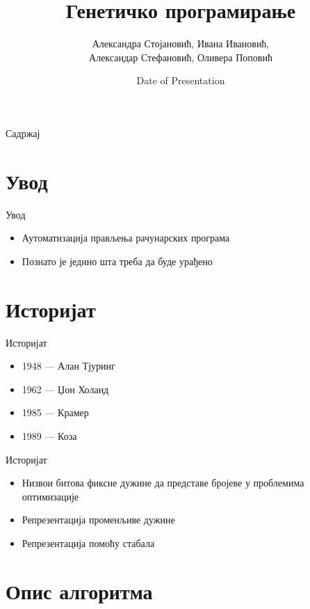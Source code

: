 \documentclass{beamer}
\title[Генетичко програмирање]{Генетичко програмирање}
\author{Александра Стојановић, Ивана Ивановић,\\ Александар Стефановић, Оливера Поповић}
\institute{Математички факултет}
\date{Date of Presentation}
\begin{document}
\begin{frame}
  \titlepage
\end{frame}

\begin{frame}{Садржај}
  \tableofcontents
\end{frame}

\section{Увод}

	\begin{frame}{Увод}

	\begin{itemize}
	  \item Аутоматизација прављења рачунарских програма
	  \item Познато је једино шта треба да буде урађено
	\end{itemize}

	\end{frame}

\section{Историјат}

	\begin{frame}{Историјат}
		\begin{itemize}
			\item 1948 — Алан Тјуринг
     		\item 1962 — Џон Холанд	
     		\item 1985 — Крамер
     		\item 1989 — Коза
		\end{itemize}
	\end{frame}

	\begin{frame}{Историјат}
		\begin{itemize}
			\item Низвои битова фиксне дужине да представе бројеве у проблемима оптимизације
     		\item Репрезентација променљиве дужине
     		\item Репрезентација помоћу стабала
		\end{itemize}
	\end{frame}

\section{Опис алгоритма}
\end{document}
